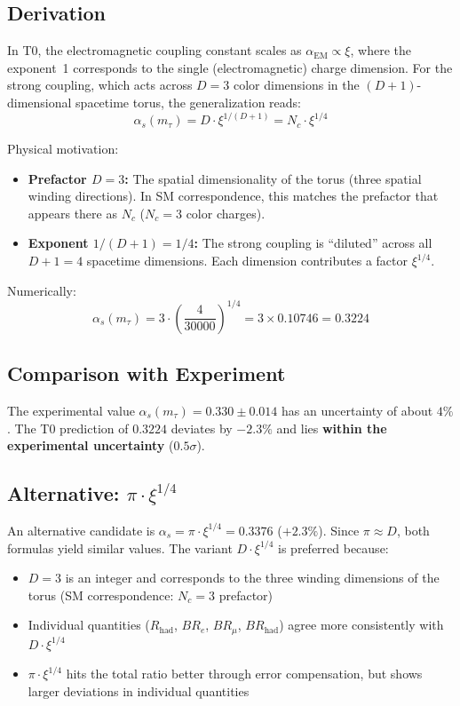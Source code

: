 	\subsection{Derivation}
	
	In T0, the electromagnetic coupling constant scales as $\alpha_\text{EM} \propto \xi$, where the exponent~1 corresponds to the single (electromagnetic) charge dimension. For the strong coupling, which acts across $D = 3$ color dimensions in the $(D+1)$-dimensional spacetime torus, the generalization reads:
	\begin{equation}
		\alpha_s(m_\tau) = D \cdot \xi^{1/(D+1)} = N_c \cdot \xi^{1/4}
	\end{equation}
	
	Physical motivation:
	\begin{itemize}
		\item \textbf{Prefactor $D = 3$:} The spatial dimensionality of the torus (three spatial winding directions). In SM correspondence, this matches the prefactor that appears there as $N_c$ ($N_c=3$ color charges).
		\item \textbf{Exponent $1/(D+1) = 1/4$:} The strong coupling is ``diluted'' across all $D+1 = 4$ spacetime dimensions. Each dimension contributes a factor $\xi^{1/4}$.
	\end{itemize}
	
	Numerically:
	\begin{equation}
		\alpha_s(m_\tau) = 3 \cdot \left(\frac{4}{30000}\right)^{1/4} = 3 \times 0.10746 = 0.3224
	\end{equation}
	
	\subsection{Comparison with Experiment}
	
	The experimental value $\alpha_s(m_\tau) = 0.330 \pm 0.014$ has an uncertainty of about $4\%$. The T0 prediction of $0.3224$ deviates by $-2.3\%$ and lies \textbf{within the experimental uncertainty} ($0.5\sigma$).
	
	\subsection{Alternative: $\pi \cdot \xi^{1/4}$}
	
	An alternative candidate is $\alpha_s = \pi \cdot \xi^{1/4} = 0.3376$ ($+2.3\%$). Since $\pi \approx D$, both formulas yield similar values. The variant $D \cdot \xi^{1/4}$ is preferred because:
	\begin{itemize}
		\item $D = 3$ is an integer and corresponds to the three winding dimensions of the torus (SM correspondence: $N_c=3$ prefactor)
		\item Individual quantities ($R_\text{had}$, $BR_e$, $BR_\mu$, $BR_\text{had}$) agree more consistently with $D \cdot \xi^{1/4}$
		\item $\pi \cdot \xi^{1/4}$ hits the total ratio better through error compensation, but shows larger deviations in individual quantities
	\end{itemize}
	
